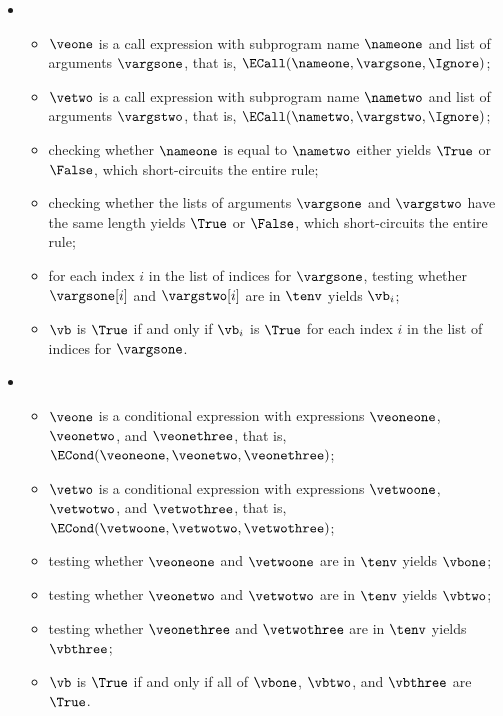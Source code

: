 \begin{itemize}
  \item {}
  \begin{itemize}
    \item $\veone$ is a call expression with subprogram name $\nameone$ and list of arguments $\vargsone$,
          that is, $\ECall(\nameone, \vargsone, \Ignore)$;
    \item $\vetwo$ is a call expression with subprogram name $\nametwo$ and list of arguments $\vargstwo$,
          that is, $\ECall(\nametwo, \vargstwo, \Ignore)$;
    \item checking whether $\nameone$ is equal to $\nametwo$ either yields $\True$ or $\False$, which short-circuits the entire rule;
    \item checking whether the lists of arguments $\vargsone$ and $\vargstwo$ have the same length yields
          $\True$ or $\False$, which short-circuits the entire rule;
    \item for each index $i$ in the list of indices for $\vargsone$, testing whether $\vargsone[i]$ and $\vargstwo[i]$
          are \equivalentexprsterm{} in $\tenv$ yields $\vb_i$\ProseOrTypeError;
    \item $\vb$ is $\True$ if and only if $\vb_i$ is $\True$ for each index $i$ in the list of indices for $\vargsone$.
  \end{itemize}

  \item {}
  \begin{itemize}
    \item $\veone$ is a conditional expression with expressions $\veoneone$, $\veonetwo$, and $\veonethree$,
          that is, $\ECond(\veoneone, \veonetwo, \veonethree)$;
    \item $\vetwo$ is a conditional expression with expressions $\vetwoone$, $\vetwotwo$, and $\vetwothree$,
          that is, $\ECond(\vetwoone, \vetwotwo, \vetwothree)$;
    \item testing whether $\veoneone$ and $\vetwoone$ are \equivalentexprsterm{} in $\tenv$ yields $\vbone$\ProseOrTypeError;
    \item testing whether $\veonetwo$ and $\vetwotwo$ are \equivalentexprsterm{} in $\tenv$ yields $\vbtwo$\ProseOrTypeError;
    \item testing whether $\veonethree$ and $\vetwothree$ are \equivalentexprsterm{} in $\tenv$ yields $\vbthree$\ProseOrTypeError;
    \item $\vb$ is $\True$ if and only if all of $\vbone$, $\vbtwo$, and $\vbthree$ are $\True$.
  \end{itemize}


\end{itemize}
